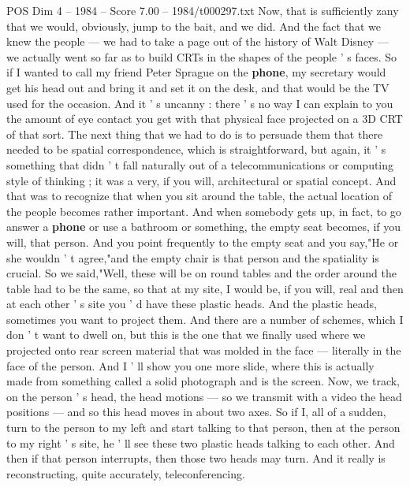 \begin{textsample}{POS Dim 4 – 1984 – Score 7.00 – 1984/t000297.txt}
Now, that is sufficiently zany that we would, obviously, jump to the bait, and we did.
And the fact that we knew the people — we had to take a page out of the history of Walt Disney — we actually went so far as to build CRTs in the shapes of the people ' s faces.
So if I wanted to call my friend Peter Sprague on the \textbf{phone}, my secretary would get his head out and bring it and set it on the desk, and that would be the TV used for the occasion.
And it ' s uncanny : there ' s no way I can explain to you the amount of eye contact you get with that physical face projected on a 3D CRT of that sort.
The next thing that we had to do is to persuade them that there needed to be spatial correspondence, which is straightforward, but again, it ' s something that didn ' t fall naturally out of a telecommunications or computing style of thinking ; it was a very, if you will, architectural or spatial concept.
And that was to recognize that when you sit around the table, the actual location of the people becomes rather important.
And when somebody gets up, in fact, to go answer a \textbf{phone} or use a bathroom or something, the empty seat becomes, if you will, that person.
And you point frequently to the empty seat and you say,"He or she wouldn ' t agree,"and the empty chair is that person and the spatiality is crucial.
So we said,"Well, these will be on round tables and the order around the table had to be the same, so that at my site, I would be, if you will, real and then at each other ' s site you ' d have these plastic heads.
And the plastic heads, sometimes you want to project them.
And there are a number of schemes, which I don ' t want to dwell on, but this is the one that we finally used where we projected onto rear screen material that was molded in the face — literally in the face of the person.
And I ' ll show you one more slide, where this is actually made from something called a solid photograph and is the screen.
Now, we track, on the person ' s head, the head motions — so we transmit with a video the head positions — and so this head moves in about two axes.
So if I, all of a sudden, turn to the person to my left and start talking to that person, then at the person to my right ' s site, he ' ll see these two plastic heads talking to each other.
And then if that person interrupts, then those two heads may turn.
And it really is reconstructing, quite accurately, teleconferencing.

\end{textsample}
